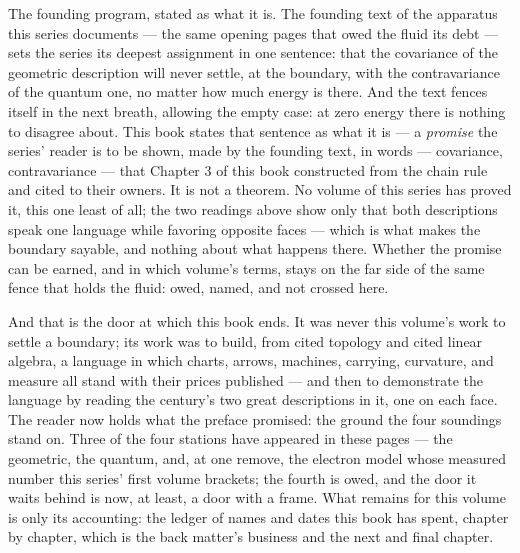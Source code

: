\begin{fence}
The founding program, stated as what it is. The founding text of the
apparatus this series documents --- the same opening pages that owed the
fluid its debt --- sets the series its deepest assignment in one
sentence: that the covariance of the geometric description will never
settle, at the boundary, with the contravariance of the quantum one, no
matter how much energy is there. And the text fences itself in the next
breath, allowing the empty case: at zero energy there is nothing to
disagree about. This book states that sentence as what it is --- a
\emph{promise} the series' reader is to be shown, made by the founding
text, in words --- covariance, contravariance --- that Chapter 3 of this
book constructed from the chain rule and cited to their owners. It is
not a theorem. No volume of this series has proved it, this one least
of all; the two readings above show only that both descriptions speak
one language while favoring opposite faces --- which is what makes the
boundary sayable, and nothing about what happens there. Whether the
promise can be earned, and in which volume's terms, stays on the far
side of the same fence that holds the fluid: owed, named, and not
crossed here.
\end{fence}

And that is the door at which this book ends. It was never this volume's
work to settle a boundary; its work was to build, from cited topology
and cited linear algebra, a language in which charts, arrows, machines,
carrying, curvature, and measure all stand with their prices published
--- and then to demonstrate the language by reading the century's two
great descriptions in it, one on each face. The reader now holds what
the preface promised: the ground the four soundings stand on. Three of
the four stations have appeared in these pages --- the geometric, the
quantum, and, at one remove, the electron model whose measured number
this series' first volume brackets; the fourth is owed, and the door it
waits behind is now, at least, a door with a frame. What remains for
this volume is only its accounting: the ledger of names and dates this
book has spent, chapter by chapter, which is the back matter's business
and the next and final chapter.
